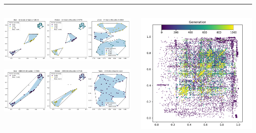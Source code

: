 \documentclass{beamer}
\begin{document}
\begin{columns}
\begin{column}{0.3\textwidth}
    \end{column}
\end{columns}

\vspace{2em}
\hrule height 3pt
\vspace{2em}

\begin{columns}
    \begin{column}{0.4\textwidth}
        \begin{center}
            \includegraphics[width=\linewidth]{img/Fig12a.pdf}

            \vspace{1em}

            \includegraphics[width=\linewidth]{img/Fig12b.pdf}
        \end{center}
    \end{column}
    \begin{column}{0.3\textwidth}
        \includegraphics[width=\linewidth]{img/Fig15.pdf}
    \end{column}
\end{columns}
\end{document}
